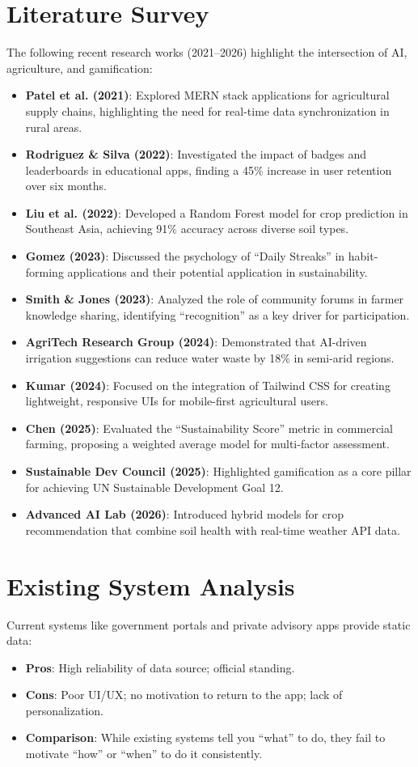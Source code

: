 \documentclass[journal]{IEEEtran}
\begin{document}
\section{Literature Survey}
The following recent research works (2021--2026) highlight the intersection of AI, agriculture, and gamification:
\begin{itemize}
    \item \textbf{Patel et al. (2021)}: Explored MERN stack applications for agricultural supply chains, highlighting the need for real-time data synchronization in rural areas.
    \item \textbf{Rodriguez \& Silva (2022)}: Investigated the impact of badges and leaderboards in educational apps, finding a 45\% increase in user retention over six months.
    \item \textbf{Liu et al. (2022)}: Developed a Random Forest model for crop prediction in Southeast Asia, achieving 91\% accuracy across diverse soil types.
    \item \textbf{Gomez (2023)}: Discussed the psychology of ``Daily Streaks'' in habit-forming applications and their potential application in sustainability.
    \item \textbf{Smith \& Jones (2023)}: Analyzed the role of community forums in farmer knowledge sharing, identifying ``recognition'' as a key driver for participation.
    \item \textbf{AgriTech Research Group (2024)}: Demonstrated that AI-driven irrigation suggestions can reduce water waste by 18\% in semi-arid regions.
    \item \textbf{Kumar (2024)}: Focused on the integration of Tailwind CSS for creating lightweight, responsive UIs for mobile-first agricultural users.
    \item \textbf{Chen (2025)}: Evaluated the ``Sustainability Score'' metric in commercial farming, proposing a weighted average model for multi-factor assessment.
    \item \textbf{Sustainable Dev Council (2025)}: Highlighted gamification as a core pillar for achieving UN Sustainable Development Goal 12.
    \item \textbf{Advanced AI Lab (2026)}: Introduced hybrid models for crop recommendation that combine soil health with real-time weather API data.
\end{itemize}

\section{Existing System Analysis}
Current systems like government portals and private advisory apps provide static data:
\begin{itemize}
    \item \textbf{Pros}: High reliability of data source; official standing.
    \item \textbf{Cons}: Poor UI/UX; no motivation to return to the app; lack of personalization.
    \item \textbf{Comparison}: While existing systems tell you ``what'' to do, they fail to motivate ``how'' or ``when'' to do it consistently.
\end{itemize}
\end{document}
